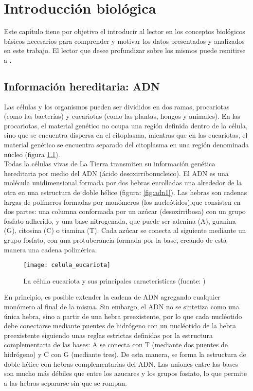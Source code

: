 \chapter{Introducción biológica}
Este capítulo tiene por objetivo el introducir al lector en los conceptos biológicos básicos necesarios para comprender y motivar los datos presentados y analizados en este trabajo. El lector que desee profundizar sobre los mismos puede remitirse a \cite{Domany2003, Alberts2015}.

\section{Información hereditaria: ADN}
Las células y los organismos pueden ser divididos en dos ramas, procariotas (como las bacterias) y eucariotas (como las plantas, hongos y animales). En las procariotas, el material genético no ocupa una región definida dentro de la célula, sino que se encuentra dispersa en el citoplasma, mientras que en las eucariotas, el material genético se encuentra separado del citoplasma en una región denominada núcleo (figura \ref{fig:celula_eucariota}).\\
Todas la células vivas de La Tierra transmiten su información genética hereditaria por medio del ADN (ácido desoxirribonucleico). El ADN es una molécula unidimensional formada por dos hebras enrolladas una alrededor de la otra en una estructura de doble hélice (figura: \ref{fig:adn1}). Las hebras son cadenas largas de polímeros formadas por monómeros (los nucleótidos),que consisten en dos partes: una columna conformada por un azúcar (desoxirribosa) con un grupo fosfato adherido, y una base nitrogenada, que puede ser adenina (A), guanina (G), citosina (C) o tiamina (T). Cada azúcar se conecta al siguiente mediante un grupo fosfato, con una protuberancia formada por la base, creando de esta manera una cadena polimérica. 
\begin{figure}[h]
    \centering
    \texttt{[image: celula\_eucariota]}
    \caption{La célula eucariota y sus principales características (fuente: \cite{Alberts2015})}
    \label{fig:celula_eucariota}
\end{figure}
En principio, es posible extender la cadena de ADN agregando cualquier monómero al final de la misma. Sin embargo, el ADN no se sintetiza como una única hebra, sino a partir de una hebra preexistente, por lo que cada nucléotido debe conectarse mediante puentes de hidrógeno con un nucléotido de la hebra preexistente siguiendo unas reglas estrictas definidas por la estructura complementaria de las bases: A se conecta con T (mediante dos puentes de hidrógeno) y C con G (mediante tres). De esta manera, se forma la estructura de doble hélice con hebras complementarias del ADN. Las uniones entre las bases son mucho más débiles que entre los azucares y los grupos fosfato, lo que permite a las hebras separarse sin que se rompan.\\
